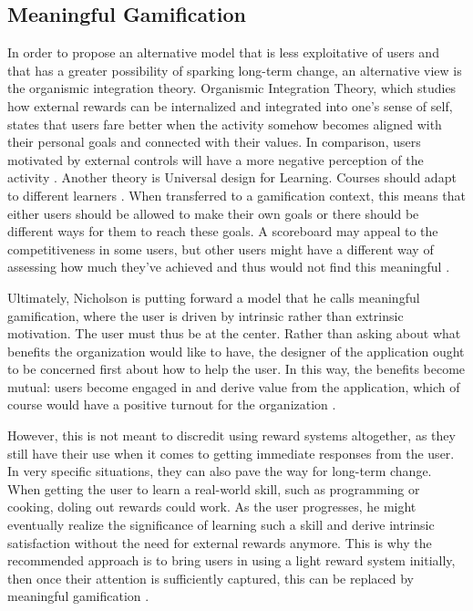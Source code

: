 \subsection{Meaningful Gamification}

In order to propose an alternative model that is less exploitative of users and that has a greater possibility of sparking long-term change, an alternative view is the organismic integration theory. Organismic Integration Theory, which studies how external rewards can be internalized and integrated into one’s sense of self, states that users fare better when the activity somehow becomes aligned with their personal goals and connected with their values. In comparison, users motivated by external controls will have a more negative perception of the activity \cite{reeve2004}.
Another theory is Universal design for Learning. Courses should adapt to different learners \cite{rose2000universal}. When transferred to a gamification context, this means that either users should be allowed to make their own goals or there should be different ways for them to reach these goals. A scoreboard may appeal to the competitiveness in some users, but other users might have a different way of assessing how much they’ve achieved and thus would not find this meaningful \cite{nicholson2012user}.

Ultimately, Nicholson is putting forward a model that he calls meaningful gamification, where the user is driven by intrinsic rather than extrinsic motivation. The user must thus be at the center. Rather than asking about what benefits the organization would like to have, the designer of the application ought to be concerned first about how to help the user. In this way, the benefits become mutual: users become engaged in and derive value from the application, which of course would have a positive turnout for the organization \cite{nicholson2012user}.

However, this is not meant to discredit using reward systems altogether, as they still have their use when it comes to getting immediate responses from the user. In very specific situations, they can also pave the way for long-term change. When getting the user to learn a real-world skill, such as programming or cooking, doling out rewards could work. As the user progresses, he might eventually realize the significance of learning such a skill and derive intrinsic satisfaction without the need for external rewards anymore. This is why the recommended approach is to bring users in using a light reward system initially, then once their attention is sufficiently captured, this can be replaced by meaningful gamification \cite{scottnicholson2014}.

